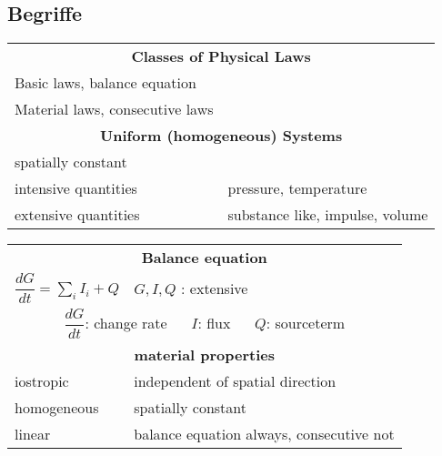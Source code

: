 \renewcommand{\arraystretch}{2}	
{
	\subsection{Begriffe}
	\begin{multicols}{2}
		
	\begin{tabularx}{\linewidth}{lX}
		\multicolumn{2}{c}{\textbf{Classes of Physical Laws}}\\
		Basic laws, balance equation & \\
		Material laws, consecutive laws & \\
		 
		\multicolumn{2}{c}{\textbf{Uniform (homogeneous) Systems}}\\
		spatially constant& \\		
		intensive quantities& pressure, temperature\\		
		extensive quantities & substance like, impulse, volume\\
	\end{tabularx}
	\vfill\columnbreak
		\begin{tabularx}{\linewidth}{lX}
			\multicolumn{2}{c}{\textbf{Balance equation}}\\
			$\dfrac{dG}{dt} = \sum\limits_{i} I_{i} + Q$ & $ G, I, Q$ : extensive \\
			\multicolumn{2}{c}{
				$\dfrac{dG}{dt}$: change rate $\quad$
				$I$: flux $\quad$
				$Q$: sourceterm} \\		
			
			\multicolumn{2}{c}{\textbf{material properties}}\\
			iostropic & independent of spatial direction\\
			homogeneous & spatially constant\\
			linear & balance equation always, consecutive not\\
		\end{tabularx}
	\end{multicols}
\renewcommand{\arraystretch}{1.2}			
	
}
